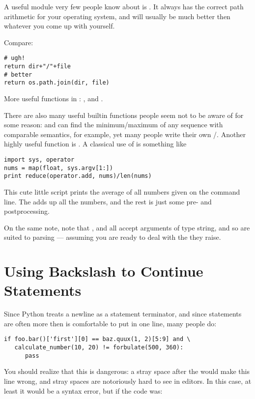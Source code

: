 \documentclass{howto}
\begin{document}
A useful module very few people know about is . It 
always has the correct path arithmetic for your operating system, and
will usually be much better then whatever you come up with yourself.

Compare:

\begin{verbatim}
# ugh!
return dir+"/"+file
# better
return os.path.join(dir, file)
\end{verbatim}

More useful functions in : , 
 and .

There are also many useful builtin functions people seem not to be
aware of for some reason:  and  can
find the minimum/maximum of any sequence with comparable semantics,
for example, yet many people write their own
/. Another highly useful function is
. A classical use of 
is something like

\begin{verbatim}
import sys, operator
nums = map(float, sys.argv[1:])
print reduce(operator.add, nums)/len(nums)
\end{verbatim}

This cute little script prints the average of all numbers given on the
command line. The  adds up all the numbers, and
the rest is just some pre- and postprocessing.

On the same note, note that ,  and
 all accept arguments of type string, and so are
suited to parsing --- assuming you are ready to deal with the
 they raise.

\section{Using Backslash to Continue Statements}

Since Python treats a newline as a statement terminator,
and since statements are often more then is comfortable to put
in one line, many people do:

\begin{verbatim}
if foo.bar()['first'][0] == baz.quux(1, 2)[5:9] and \
   calculate_number(10, 20) != forbulate(500, 360):
      pass
\end{verbatim}

You should realize that this is dangerous: a stray space after the
\code{\\} would make this line wrong, and stray spaces are notoriously
hard to see in editors. In this case, at least it would be a syntax
error, but if the code was:
\end{document}
